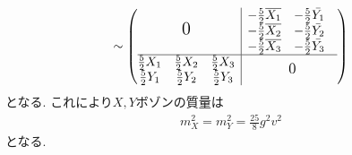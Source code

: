 \begin{align}
  [V_\mu, \Sigma] \sim \left(\begin{array}{@{}c|c@{}}
      {\Large{\mbox{$0$}}} &
      \begin{matrix}
        -\frac{5}{2}\overline{X_1} & -\frac{5}{2}\bar{Y_1} &   \\
        -\frac{5}{2}\overline{X_2} & -\frac{5}{2}\bar{Y_2} &   \\
        -\frac{5}{2}\overline{X_3} & -\frac{5}{2}\bar{Y_3} &   \\
      \end{matrix} \\
      \hline
      \begin{matrix}
        \frac{5}{2}X_1 & \frac{5}{2}X_2 & \frac{5}{2}X_3 \\
        \frac{5}{2}Y_1 & \frac{5}{2}Y_2 & \frac{5}{2}Y_3 \\
      \end{matrix} & {\large{\mbox{$0$}}}
  \end{array}\right)
\end{align}  
となる.
これにより$X, Y$ボゾンの質量は
\begin{align}
  m_X^2 = m_Y^2 = \frac{25}{8}g^2v^2
\end{align}
となる.

